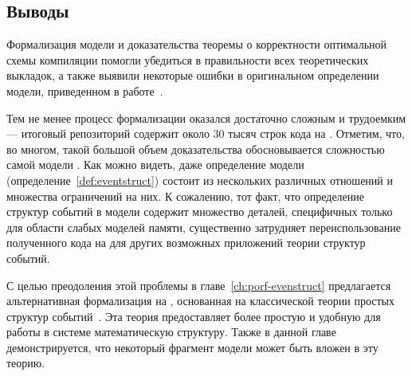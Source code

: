 \subsection*{Выводы}

Формализация модели \Wkm и доказательства теоремы 
о корректности оптимальной схемы компиляции
помогли убедиться в правильности всех теоретических выкладок,
а также выявили некоторые ошибки в оригинальном определении модели,
приведенном в работе~\cite{Chakraborty-Vafeiadis:POPL19}.

Тем не менее процесс формализации оказался достаточно сложным и трудоемким --- 
итоговый репозиторий содержит около 30 тысяч строк кода на \coq. 
Отметим, что, во многом,  такой большой объем доказательства обосновывается 
сложностью самой модели \Wkm. Как можно видеть, даже 
определение модели (определение~\ref{def:eventstruct})
состоит из нескольких различных отношений и множества ограничений на них.
К сожалению, тот факт, что определение структур событий в модели \Wkm 
содержит множество деталей, специфичных только для области 
слабых моделей памяти, существенно затрудняет переиспользование
полученного кода на \coq для других возможных приложений теории структур событий. 

С целью преодоления этой проблемы в главе~\ref{ch:porf-evenstruct} 
предлагается альтернативная формализация на \coq, 
основанная на классической теории простых структур событий~\cite{Winskel:86}.
Эта теория предоставляет более простую и удобную 
для работы в системе \coq математическую структуру.
Также в данной главе демонстрируется, что некоторый фрагмент 
модели \Wkm может быть вложен в эту теорию.
